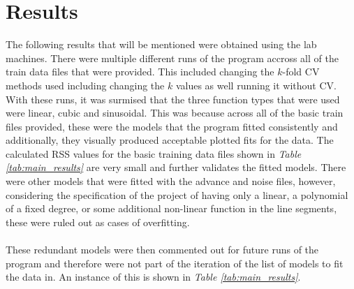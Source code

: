 \documentclass[a4paper,11pt]{article}
\begin{document}
\section{Results}
The following results that will be mentioned were obtained using the lab machines.
There were multiple different runs of the program accross all of the train data
files that were provided. This included changing the $k$-fold CV methods used including
changing the $k$ values as well running it without CV. With these runs, it was
surmised that the three function types that were used were linear, cubic and sinusoidal.
This was because across all of the basic train files provided, these were the models
that the program fitted consistently and additionally, they visually produced
acceptable plotted fits for the data. The calculated RSS values for the basic training data
files shown in \textit{Table \ref{tab:main_results}} are very small and further validates the fitted
models. There were other models that were fitted with the advance and noise files, however,
considering the specification of the project of having only a linear, a polynomial of a
fixed degree, or some additional non-linear function in the line segments, these were
ruled out as cases of overfitting.
\\ \\
These redundant models were then commented out for future runs of the program
and therefore were not part of the iteration of the list of models to fit the data
in. An instance of this is shown in \textit{Table \ref{tab:main_results}}.
\end{document}
